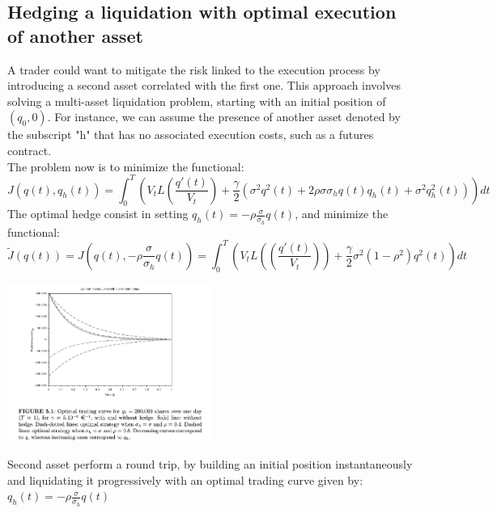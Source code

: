 \subsection{Hedging a liquidation with optimal execution of another asset}
A trader could want to mitigate the risk linked to the execution process by introducing a second asset correlated with the first one. This approach involves solving a multi-asset liquidation problem, starting with an initial position of $(q_0, 0)$. For instance, we can assume the presence of another asset denoted by the subscript "h" that has no associated execution costs, such as a futures contract.\\
The problem now is to minimize the functional:
\[
J(q(t),q_h(t)) = \int_{0}^{T} \left(V_t L \left(\frac{q'(t)}{V_t}\right) + \frac{\gamma}{2}\left(\sigma^2q^2(t) + 2 \rho \sigma \sigma_h q(t) q_h (t) + \sigma^2q_h^2(t)\right)\right)dt
\]
The optimal hedge consist in setting $q_h(t) = -\rho \frac{\sigma}{\sigma_h}q(t)$, and minimize the functional:
\[
\tilde{J}(q(t)) = J\left(q(t), - \rho \frac{\sigma}{\sigma_h}q(t)\right) = \int_{0}^{T} \left(V_t L \left(\left(\frac{q'(t)}{V_t}\right)\right) + \frac{\gamma}{2} \sigma^2 (1 - \rho^2)q^2(t)\right)dt
\]
\begin{center}
	\includegraphics[width=0.5\textwidth]{picture/(9)AC_optimal_hedge.png}
\end{center}
Second asset perform a round trip, by building an initial position instantaneously and liquidating it progressively with an optimal trading curve given by: $q_h(t) = - \rho \frac{\sigma}{\sigma_h}q(t)$
